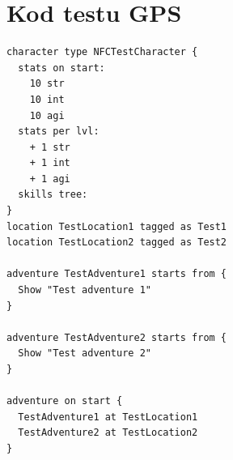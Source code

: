\documentclass[openright]{xmgr}
\begin{document}
\chapter{Kod testu GPS}

\begin{verbatim}
character type NFCTestCharacter {
  stats on start:
    10 str
    10 int
    10 agi
  stats per lvl:
    + 1 str
    + 1 int
    + 1 agi
  skills tree:
}
location TestLocation1 tagged as Test1
location TestLocation2 tagged as Test2

adventure TestAdventure1 starts from {
  Show "Test adventure 1"
}

adventure TestAdventure2 starts from {
  Show "Test adventure 2"
}

adventure on start {
  TestAdventure1 at TestLocation1
  TestAdventure2 at TestLocation2
}
\end{verbatim}




\listoftables


\oswiadczenie
\end{document}
